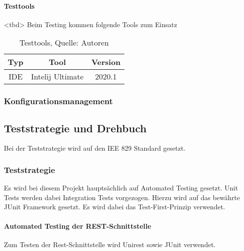 \documentclass[12pt,titlepage]{article}
\begin{document}
\paragraph{Testtools}
<tbd>
Beim Testing kommen folgende Tools zum Einsatz

\begin{table}[H]
\setlength\extrarowheight{2pt} %
\begin{tabularx}{\textwidth}{|C|C|C|}
\hline
\textbf{Typ} &\textbf{Tool} & \textbf{Version}  \\

\hline
IDE & Intelij Ultimate  & 2020.1\\
\hline
\end{tabularx}
\caption{ \label{tbl: Testtools}Testtools, Quelle: Autoren}
\end{table}
\subsubsection{Konfigurationsmanagement}
\subsection{Teststrategie und Drehbuch}
Bei der Teststrategie wird auf den IEE 829 Standard gesetzt. 
\subsubsection{Teststrategie}
Es wird bei diesem Projekt hauptsächlich auf Automated Testing gesetzt. Unit Tests werden dabei Integration Tests vorgezogen. Hierzu wird auf das bewährte JUnit Framework gesetzt. Es wird dabei das Test-First-Prinzip verwendet. 

\paragraph{Automated Testing der REST-Schnittstelle}
Zum Testen der Rest-Schnittstelle wird Unirest sowie JUnit verwendet.  
\end{document}
